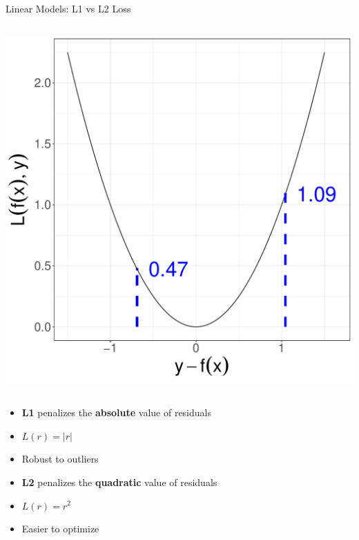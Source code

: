 \documentclass[11pt,compress,t,notes=noshow, xcolor=table]{beamer}
\begin{document}
\begin{vbframe}{Linear Models: L1 vs L2 Loss}
\begin{columns}
\begin{column}{0.4\textwidth}
\begin{center}
  \includegraphics[width = \textwidth]{figure/nutshell-regression-L2.pdf}
\end{center}
\end{column}
\end{columns}

\begin{minipage}[t]{0.45\textwidth}
    \footnotesize
    \begin{itemize}
        \item \small \textbf{L1} penalizes the \textbf{absolute} value of residuals 
        \item \textbf{$L(r) = |r|$}
        \item \small Robust to outliers

    \end{itemize}
\end{minipage}
\hfill
\begin{minipage}[t]{0.45\textwidth}
    \footnotesize
    \begin{itemize}
        \item \small \textbf{L2} penalizes the \textbf{quadratic} value of residuals
        \item \textbf{$L(r) = r^2$}
        \item \small Easier to optimize
    \end{itemize}
\end{minipage}


\end{vbframe}
\end{document}
